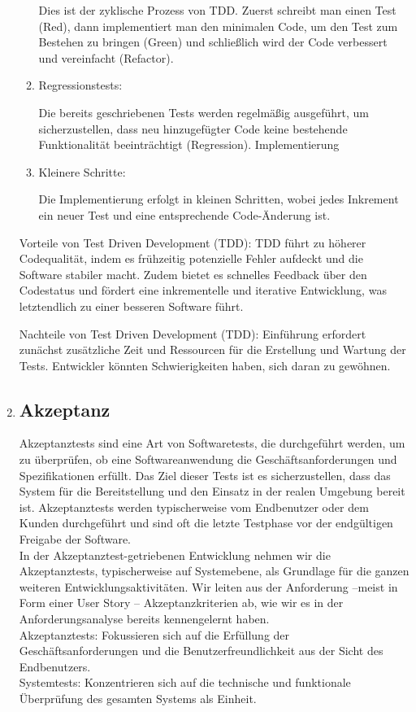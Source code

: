 \documentclass{article}
\begin{document}
\begin{enumerate}[label=\alph*)]
\begin{enumerate}[label=\arabic*)]
Dies ist der zyklische Prozess von TDD. Zuerst schreibt man einen Test (Red), dann implementiert man den minimalen Code, um den Test zum Bestehen zu bringen (Green) und schließlich wird der Code verbessert und vereinfacht (Refactor).
\item Regressionstests:

Die bereits geschriebenen Tests werden regelmäßig ausgeführt, um sicherzustellen, dass neu hinzugefügter Code keine bestehende Funktionalität beeinträchtigt (Regression).
Implementierung
\item Kleinere Schritte:

Die Implementierung erfolgt in kleinen Schritten, wobei jedes Inkrement ein neuer Test und eine entsprechende Code-Änderung ist.   
   \end{enumerate}  
Vorteile von Test Driven Development (TDD):
TDD führt zu höherer Codequalität, indem es frühzeitig potenzielle Fehler aufdeckt und die Software stabiler macht. Zudem bietet es schnelles Feedback über den Codestatus und fördert eine inkrementelle und iterative Entwicklung, was letztendlich zu einer besseren Software führt.

Nachteile von Test Driven Development (TDD):
Einführung erfordert zunächst zusätzliche Zeit und Ressourcen für die Erstellung und Wartung der Tests. Entwickler könnten Schwierigkeiten haben, sich daran zu gewöhnen.

\newpage
\item \subsection*{Akzeptanz}
   Akzeptanztests sind eine Art von Softwaretests, die durchgeführt werden, um zu überprüfen, ob eine Softwareanwendung die Geschäftsanforderungen und Spezifikationen erfüllt. Das Ziel dieser Tests ist es sicherzustellen, dass das System für die Bereitstellung und den Einsatz in der realen Umgebung bereit ist. Akzeptanztests werden typischerweise vom Endbenutzer oder dem Kunden durchgeführt und sind oft die letzte Testphase vor der endgültigen Freigabe der Software.\\
   In der Akzeptanztest-getriebenen Entwicklung nehmen wir die Akzeptanztests, typischerweise auf
Systemebene, als Grundlage für die ganzen weiteren Entwicklungsaktivitäten. Wir leiten aus der Anforderung –meist in Form einer User Story – Akzeptanzkriterien ab, wie wir es in der Anforderungsanalyse bereits
kennengelernt haben.\\
Akzeptanztests: Fokussieren sich auf die Erfüllung der Geschäftsanforderungen und die Benutzerfreundlichkeit aus der Sicht des Endbenutzers.\\
Systemtests: Konzentrieren sich auf die technische und funktionale Überprüfung des gesamten Systems als Einheit.


\end{enumerate}
\end{document}
